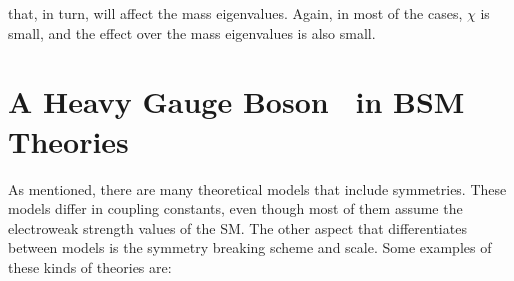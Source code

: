  \noindent that, in turn, will affect the mass eigenvalues. Again, in most of the 
 cases, $\chi$ is small, and the effect over the mass 
 eigenvalues is also small.

\section{A Heavy Gauge Boson \Zprime~in BSM Theories}
\label{sec:Models}

As mentioned, there are many theoretical models 
that include \Uprime symmetries. These models differ in coupling 
constants, even though most of them assume the electroweak
strength values of the SM. The other aspect that 
differentiates between models is the symmetry 
breaking scheme and scale. Some examples of these kinds 
of theories are:


